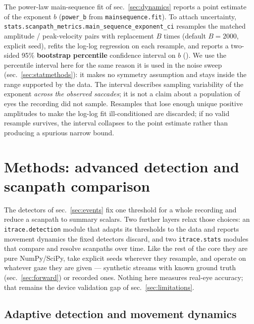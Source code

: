 \documentclass[
]{article}
\begin{document}
The power-law main-sequence fit of sec.~\ref{sec:dynamics} reports a
point estimate of the exponent \(b\) (\texttt{power\_b} from
\texttt{mainsequence.fit}). To attach uncertainty,
\texttt{stats.scanpath\_metrics.main\_sequence\_exponent\_ci} resamples
the matched amplitude / peak-velocity pairs with replacement \(B\) times
(default \(B = 2000\), explicit seed), refits the log-log regression on
each resample, and reports a two-sided 95\% \textbf{bootstrap
percentile} confidence interval on \(b\)
(). We
use the percentile interval here for the same reason it is used in the
noise sweep (sec.~\ref{sec:statmethods}): it makes no symmetry
assumption and stays inside the range supported by the data. The
interval describes sampling variability of the exponent \emph{across the
observed saccades}; it is not a claim about a population of eyes the
recording did not sample. Resamples that lose enough unique positive
amplitudes to make the log-log fit ill-conditioned are discarded; if no
valid resample survives, the interval collapses to the point estimate
rather than producing a spurious narrow bound.

\section{Methods: advanced detection and scanpath
comparison}\label{sec:advdetect}

The detectors of sec.~\ref{sec:events} fix one threshold for a whole
recording and reduce a scanpath to summary scalars. Two further layers
relax those choices: an \texttt{itrace.detection} module that adapts its
thresholds to the data and reports movement dynamics the fixed detectors
discard, and two \texttt{itrace.stats} modules that compare and resolve
scanpaths over time. Like the rest of the core they are pure
NumPy/SciPy, take explicit seeds wherever they resample, and operate on
whatever gaze they are given --- synthetic streams with known ground
truth (sec.~\ref{sec:forward}) or recorded ones. Nothing here measures
real-eye accuracy; that remains the device validation gap of
sec.~\ref{sec:limitations}.

\subsection{Adaptive detection and movement
dynamics}\label{adaptive-detection-and-movement-dynamics}
\end{document}
